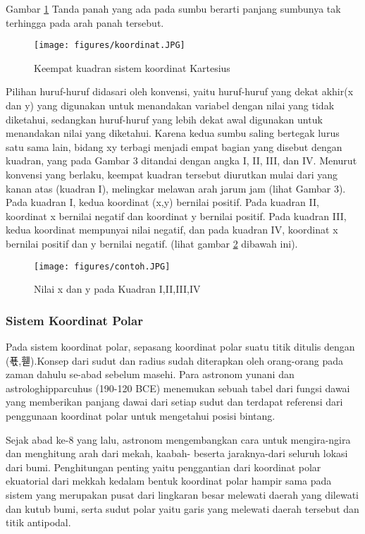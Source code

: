 Gambar \ref{koordinat} Tanda panah yang ada pada sumbu berarti panjang sumbunya tak terhingga pada arah panah tersebut.

\begin{figure}[ht]
    \centerline{\texttt{[image: figures/koordinat.JPG]}}
    \caption{Keempat kuadran sistem koordinat Kartesius}
    \label{koordinat}
    \end{figure}

Pilihan huruf-huruf didasari oleh konvensi, yaitu huruf-huruf yang dekat akhir(x dan y) yang digunakan untuk menandakan variabel dengan nilai yang tidak diketahui, sedangkan huruf-huruf yang lebih dekat awal digunakan untuk menandakan nilai yang diketahui. Karena kedua sumbu saling bertegak lurus satu sama lain, bidang xy terbagi menjadi empat bagian yang disebut dengan kuadran, yang pada Gambar 3 ditandai dengan angka I, II, III, dan IV. Menurut konvensi yang berlaku, keempat kuadran tersebut diurutkan mulai dari yang kanan atas (kuadran I), melingkar melawan arah jarum jam (lihat Gambar 3). Pada kuadran I, kedua koordinat (x,y) bernilai positif. Pada kuadran II, koordinat x bernilai negatif dan koordinat y bernilai positif. Pada kuadran III, kedua koordinat mempunyai nilai negatif, dan pada kuadran IV, koordinat x bernilai positif dan y bernilai negatif. (lihat gambar \ref{contoh} dibawah ini).

\begin{figure}[ht]
    \centerline{\texttt{[image: figures/contoh.JPG]}}
    \caption{Nilai x dan y pada Kuadran I,II,III,IV}
    \label{contoh}
    \end{figure}

\subsubsection{Sistem Koordinat Polar}
Pada sistem koordinat polar, sepasang koordinat polar suatu titik ditulis dengan (푟,휃)\cite{mufidah2015solusi}.Konsep dari sudut dan radius sudah diterapkan oleh orang-orang pada zaman dahulu se-abad sebelum masehi. Para astronom yunani dan astrologhipparcuhus (190-120 BCE) menemukan sebuah tabel dari fungsi dawai yang memberikan panjang dawai dari setiap sudut dan terdapat referensi dari penggunaan koordinat polar untuk mengetahui posisi bintang.

Sejak abad ke-8 yang lalu, astronom mengembangkan cara untuk mengira-ngira dan menghitung arah dari mekah, kaabah- beserta jaraknya-dari seluruh lokasi dari bumi. Penghitungan penting yaitu penggantian dari koordinat polar ekuatorial dari mekkah kedalam bentuk koordinat polar hampir sama pada sistem yang merupakan pusat dari lingkaran besar melewati daerah yang dilewati dan kutub bumi, serta sudut polar yaitu garis yang melewati daerah tersebut dan titik antipodal.

